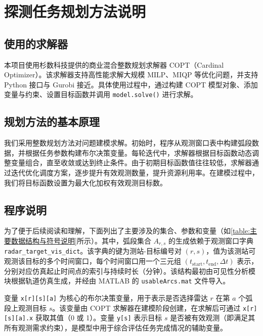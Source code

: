 \documentclass[openany,zihao=-4,UTF8]{ctexart}
\begin{document}
\newpage
\section{探测任务规划方法说明}
\subsection{使用的求解器}
本项目使用杉数科技提供的商业混合整数规划求解器 COPT（Cardinal Optimizer）。该求解器支持高性能求解大规模 MILP、MIQP 等优化问题，并支持 Python 接口与 Gurobi 接近。具体使用过程中，通过构建 COPT 模型对象、添加变量与约束、设置目标函数并调用 \texttt{model.solve()} 进行求解。

\subsection{规划方法的基本原理}
我们采用整数规划方法对问题建模求解。初始时，程序从观测窗口表中构建弧段数据，并根据任务参数构建布尔决策变量。每轮迭代中，求解器根据目标函数动态调整变量组合，直至收敛或达到终止条件。由于初期目标函数值往往较低，求解器通过迭代优化调度方案，逐步提升有效观测数量，提升资源利用率。在建模过程中，我们将目标函数设置为最大化加权有效观测目标数。

\subsection{程序说明}
为了便于后续阅读和理解，下面列出了主要涉及的集合、参数和变量（如\autoref{table:主要数据结构与符号说明}所示）。其中，弧段集合 $A_{r,s}$ 的生成依赖于观测窗口字典 \texttt{radar\_target\_vis\_dict}。该字典的键为测站-目标编号对 $(r,s)$，值为该测站可观测该目标的多个时间窗口，每个时间窗口用一个三元组 $(t_{\text{start}}, t_{\text{end}}, \Delta t)$ 表示，分别对应仿真起止时间点的索引与持续时长（分钟）。该结构最初由可见性分析模块根据轨道仿真生成，并经由 MATLAB 的 \texttt{usableArcs.mat} 文件导入。

变量 \texttt{x[r][s][a]} 为核心的布尔决策变量，用于表示是否选择雷达 $r$ 在第 $a$ 个弧段上观测目标 $s$。该变量由 COPT 求解器在建模阶段创建，在求解后可通过 \texttt{x[r][s][a].x} 获取其值（0 或 1）。变量 \texttt{y[s]} 表示目标 $s$ 是否被有效观测（即满足其所有观测需求约束），是模型中用于综合评估任务完成情况的辅助变量。
\end{document}
